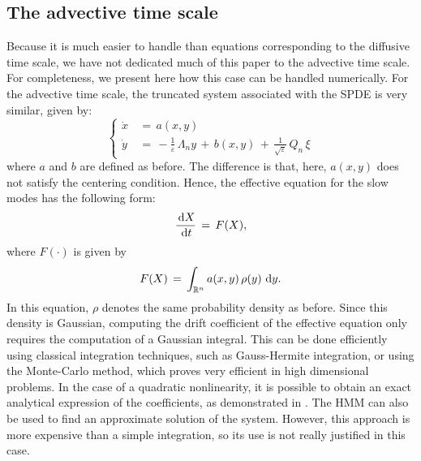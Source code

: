 \subsection{The advective time scale}
\label{sec:the_advective_time_scale}
Because it is much easier to handle than equations corresponding to the diffusive time scale, we have not dedicated much of this paper to the advective time scale.
For completeness, we present here how this case can be handled numerically.
For the advective time scale, the truncated system associated with the SPDE is very similar, given by:
\begin{equation}
    \left\{\begin{aligned} 
            \dot x\,&=\,a(x,y) \\
            \dot y\,&=\,-\frac 1 {\varepsilon}\, \Lambda_n y\,+\,b(x,y)\,+\,\frac 1{\sqrt \varepsilon}\,Q_n\,\xi
        \end{aligned} \right. 
\end{equation}
where $a$ and $b$ are defined as before. The difference is that, here, $a(x,y)$ does not satisfy the centering condition.
Hence, the effective equation for the slow modes has the following form:
$$ \frac{\,\mathrm d X}{\,\mathrm d t}\,=\, F(X), $$
where $F(\cdot)$ is given by
$$ F(X) \,=\, \int_{\mathbb R^n} a(x,y) \, \rho(y)\, \,\mathrm d y.  $$
In this equation, $\rho$ denotes the same probability density as before. 
Since this density is Gaussian, computing the drift coefficient of the effective equation only requires the computation of a Gaussian integral.
This can be done efficiently using classical integration techniques, such as Gauss-Hermite integration, or using the Monte-Carlo method, which proves very efficient in high dimensional problems.
In the case of a quadratic nonlinearity, it is possible to obtain an exact analytical expression of the coefficients, as demonstrated in \cite{abdulle2012numerical}.
The HMM can also be used to find an approximate solution of the system.
However, this approach is more expensive than a simple integration, so its use is not really justified in this case. 

